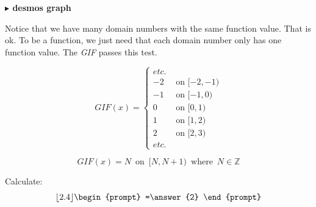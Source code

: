 \documentclass{ximera}
\begin{document}
\begin{example}
\begin{image}
\end{image}







\begin{onlineOnly}
\textbf{\textcolor{blue!55!black}{$\blacktriangleright$ desmos graph}} 
\begin{center}
\end{center}
\end{onlineOnly}




\end{example}

Notice that we have many domain numbers with the same function value. That is ok. To be a function, we just need that each domain number only has one function value.  The \textit{GIF} passes this test.






\[
GIF(x) = 
\begin{cases}
   etc. &    \\
  -2 & \text{ on } [-2, -1) \\
  -1 & \text{ on } [-1, 0) \\ 
   0 & \text{ on } [0, 1) \\
  1 & \text{ on } [1, 2) \\
   2 & \text{ on } [2, 3) \\
  etc. &  
\end{cases}
\]


\[
GIF(x) = N \, \text{ on } \, [N, N+1) \, \text{ where } \, N \in \mathbb{Z}
\]


\begin{question} 


  Calculate:
  \[
  \lfloor 2.4 \rfloor
  \begin{prompt}
    =\answer{2}
  \end{prompt}
  \]
  \end{question}
\end{document}
